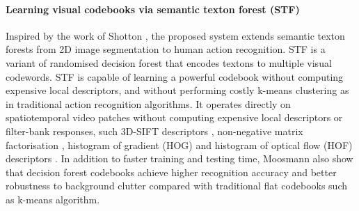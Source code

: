 \paragraph{Learning visual codebooks via semantic texton forest (STF)} 
Inspired by the work of Shotton \etal \cite{Shotton2008}, the proposed system extends semantic texton forests from 2D image segmentation to human action recognition. STF is a variant of randomised decision forest \cite{Ho1995, Amit1997, Breiman2001} that encodes textons to multiple visual codewords. STF is capable of learning a powerful codebook without computing expensive local descriptors, and without performing costly k-means clustering as in traditional action recognition algorithms. It operates directly on spatiotemporal video patches without computing expensive local descriptors or filter-bank responses, such 3D-SIFT descriptors \cite{Scovanner2007}, non-negative matrix factorisation \cite{Wong2007}, histogram of gradient (HOG) \cite{Schuldt2004, Laptev2008} and histogram of optical flow (HOF) descriptors \cite{Riemenschneider2009}. 
In addition to faster training and testing time, Moosmann \etal \cite{Moosmann2007} also show that decision forest codebooks achieve higher recognition accuracy and better robustness to background clutter compared with traditional flat codebooks such as k-means algorithm.  


